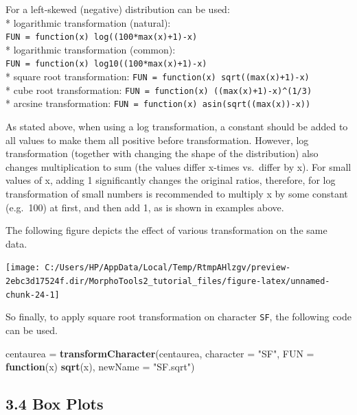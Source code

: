 \documentclass[
]{article}
\newenvironment{Shaded}{\begin{snugshade}}{\end{snugshade}}
\newcommand{\ControlFlowTok}[1]{\textcolor[rgb]{0.13,0.29,0.53}{\textbf{#1}}}
\newcommand{\DataTypeTok}[1]{\textcolor[rgb]{0.13,0.29,0.53}{#1}}
\newcommand{\KeywordTok}[1]{\textcolor[rgb]{0.13,0.29,0.53}{\textbf{#1}}}
\newcommand{\NormalTok}[1]{#1}
\newcommand{\StringTok}[1]{\textcolor[rgb]{0.31,0.60,0.02}{#1}}
\begin{document}
For a left-skewed (negative) distribution can be used:\\
* logarithmic transformation (natural):
\texttt{FUN\ =\ function(x)\ log((100*max(x)+1)-x)}\\
* logarithmic transformation (common):
\texttt{FUN\ =\ function(x)\ log10((100*max(x)+1)-x)}\\
* square root transformation:
\texttt{FUN\ =\ function(x)\ sqrt((max(x)+1)-x)}\\
* cube root transformation:
\texttt{FUN\ =\ function(x)\ ((max(x)+1)-x)\^{}(1/3)}\\
* arcsine transformation:
\texttt{FUN\ =\ function(x)\ asin(sqrt((max(x))-x))}

As stated above, when using a log transformation, a constant should be
added to all values to make them all positive before transformation.
However, log transformation (together with changing the shape of the
distribution) also changes multiplication to sum (the values differ
x-times vs.~differ by x). For small values of x, adding 1 significantly
changes the original ratios, therefore, for log transformation of small
numbers is recommended to multiply x by some constant (e.g.~100) at
first, and then add 1, as is shown in examples above.

The following figure depicts the effect of various transformation on the
same data.

\begin{center}\texttt{[image: C:/Users/HP/AppData/Local/Temp/RtmpAHlzgv/preview-2ebc3d17524f.dir/MorphoTools2\_tutorial\_files/figure-latex/unnamed-chunk-24-1]} \end{center}

So finally, to apply square root transformation on character
\texttt{SF}, the following code can be used.

\begin{Shaded}
\begin{Highlighting}[]
\NormalTok{centaurea =}\StringTok{ }\KeywordTok{transformCharacter}\NormalTok{(centaurea, }\DataTypeTok{character =} \StringTok{"SF"}\NormalTok{, }\DataTypeTok{FUN =} \ControlFlowTok{function}\NormalTok{(x) }\KeywordTok{sqrt}\NormalTok{(x), }
                               \DataTypeTok{newName =} \StringTok{"SF.sqrt"}\NormalTok{)}
\end{Highlighting}
\end{Shaded}

\hypertarget{box-plots}{%
\subsection{3.4 Box Plots}\label{box-plots}}
\end{document}
